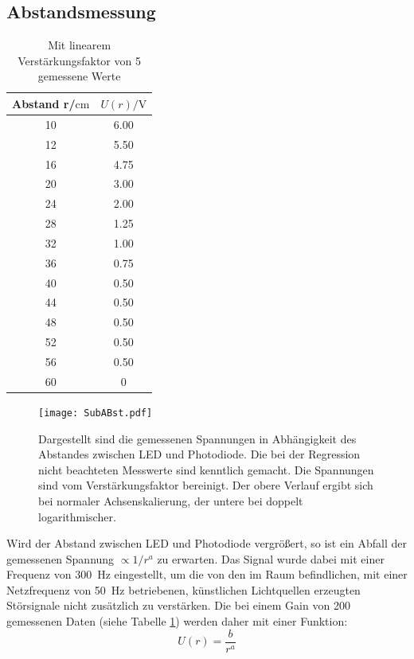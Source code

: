 \subsection{Abstandsmessung}
\label{chapter:Abst}
\begin{table}
  \centering
  \caption{Mit linearem Verstärkungsfaktor von 5 gemessene Werte}
  \label{tab:2}
  \begin{tabular}{c c}
    \toprule
    Abstand r/$\si{\centi\metre}$ & $U(r)/\si{\volt}$\\
    \midrule
    10 & 6.00 \\
    12 & 5.50 \\
    16 & 4.75 \\
    20 & 3.00 \\
    24 & 2.00 \\
    28 & 1.25 \\
    32 & 1.00 \\
    36 & 0.75 \\
    40 & 0.50 \\
    44 & 0.50 \\
    48 & 0.50 \\
    52 & 0.50 \\
    56 & 0.50 \\
    60 & 0 \\
    \bottomrule
  \end{tabular}
\end{table}
\begin{figure}
  \centering
     \texttt{[image: SubABst.pdf]}
  \caption{Dargestellt sind die gemessenen Spannungen in Abhängigkeit des Abstandes zwischen LED und Photodiode. Die bei der Regression nicht
  beachteten Messwerte sind kenntlich gemacht.
  Die Spannungen sind vom Verstärkungsfaktor bereinigt. Der obere Verlauf ergibt sich bei normaler Achsenskalierung,
  der untere bei doppelt logarithmischer.}
  \label{plot:2}
\end{figure}
Wird der Abstand zwischen LED und Photodiode vergrößert, so ist ein Abfall der gemessenen Spannung $\propto 1/r^a$ zu erwarten.
Das Signal wurde dabei mit einer Frequenz von \SI{300}{\hertz} eingestellt, um die von den im Raum
befindlichen, mit einer Netzfrequenz von \SI{50}{\hertz} betriebenen, künstlichen Lichtquellen erzeugten
Störsignale nicht zusätzlich zu verstärken. Die bei einem Gain von 200 gemessenen Daten
(siehe Tabelle \ref{tab:2}) werden daher mit einer Funktion:
\begin{equation}
  U(r) = \frac{b}{r^a}
\end{equation}
